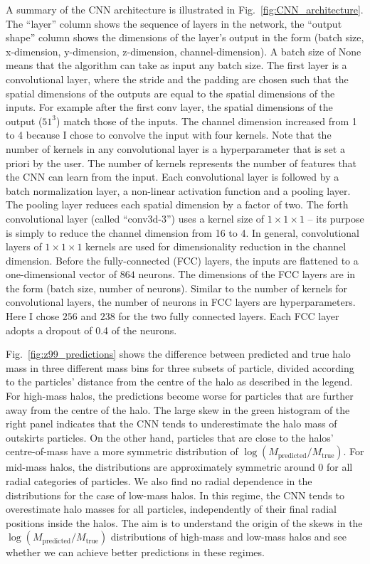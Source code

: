\documentclass[11pt]{article}
\begin{document}
A summary of the CNN architecture is illustrated in Fig.~\ref{fig:CNN_architecture}. The ``layer'' column shows the sequence of layers in the network, the ``output shape'' column shows the dimensions of the layer's output in the form (batch size, x-dimension, y-dimension, z-dimension, channel-dimension). A batch size of None means that the algorithm can take as input any batch size. The first layer is a convolutional layer, where the stride and the padding are chosen such that the spatial dimensions of the outputs are equal to the spatial dimensions of the inputs. For example after the first conv layer, the spatial dimensions of the output ($51^3$) match those of the inputs. The channel dimension increased from 1 to 4 because I chose to convolve the input with four kernels. Note that the number of kernels in any convolutional layer is a hyperparameter that is set a priori by the user. The number of kernels represents the number of features that the CNN can learn from the input. Each convolutional layer is followed by a batch normalization layer, a non-linear activation function and a pooling layer. The pooling layer reduces each spatial dimension by a factor of two. The forth convolutional layer (called ``conv3d-3'') uses a kernel size of $1\times1\times1$ -- its purpose is simply to reduce the channel dimension from 16 to 4. In general, convolutional layers of $1\times1\times1$ kernels are used for dimensionality reduction in the channel dimension. Before the fully-connected (FCC) layers, the inputs are flattened to a one-dimensional vector of $864$ neurons. The dimensions of the FCC layers are in the form (batch size, number of neurons). Similar to the number of kernels for convolutional layers, the number of neurons in FCC layers are hyperparameters. Here I chose $256$ and $238$ for the two fully connected layers. Each FCC layer adopts a dropout of 0.4 of the neurons.




Fig.~\ref{fig:z99_predictions} shows the difference between predicted and true halo mass in three different mass bins for three subsets of particle, divided according to the particles' distance from the centre of the halo as described in the legend. For high-mass halos, the predictions become worse for particles that are further away from the centre of the halo. The large skew in the green histogram of the right panel indicates that the CNN tends to underestimate the halo mass of outskirts particles. On the other hand, particles that are close to the halos' centre-of-mass have a more symmetric distribution of $\log(M_\mathrm{predicted}/M_\mathrm{true})$. For mid-mass halos, the distributions are approximately symmetric around $0$ for all radial categories of particles. We also find no radial dependence in the distributions for the case of low-mass halos. In this regime, the CNN tends to overestimate halo masses for all particles, independently of their final radial positions inside the halos. The aim is to understand the origin of the skews in the $\log(M_\mathrm{predicted}/M_\mathrm{true})$ distributions of high-mass and low-mass halos and see whether we can achieve better predictions in these regimes.
\end{document}
